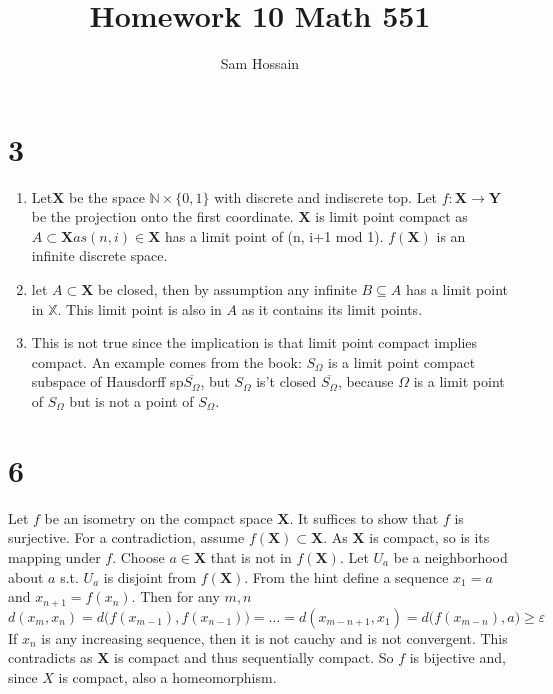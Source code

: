 \documentclass[a4paper, 12pt]{article}
\begin{document}
\title{Homework 10 Math 551}
\author{Sam Hossain}

\maketitle
\section*{3}

\begin{enumerate}[label=(\alph*)]
	\item Let$\mathbf{X}$ be the space $\mathbb{N} \times \{0, 1\}$ with discrete and indiscrete top. Let $f:\mathbf{X} \longrightarrow \mathbf{Y}$ be the projection onto the first coordinate. $\mathbf{X}$ is limit point compact as $A \subset \mathbf{X} as (n, i) \in{\mathbf{X}}$ has a limit point of (n, i+1 mod 1). $f(\mathbf{X})$ is an infinite discrete space.

	\item let $A \subset \mathbf{X}$ be closed, then by assumption any infinite $B \subseteq A$ has a limit point in $\mathbb{X}$. This limit point is also in $A$ as it contains its limit points.
	\item This is not true since the implication is that limit point compact implies compact. An example comes from the book: $S_\Omega$ is a limit point compact subspace of Hausdorff sp$\overline{S_\Omega}$, but $S_\Omega$ is't closed $\overline{S_\Omega}$, because 
$\Omega$ is a limit point of $S_\Omega$ but is not a point of $S_\Omega$.
\end{enumerate}

\section*{6}
	Let $f$ be an isometry on the compact space $\mathbf{X}$. It suffices to show that $f$ is surjective. For a contradiction, assume $f(\mathbf{X}) \subset \mathbf{X}$. As $\mathbf{X}$ is compact, so is its mapping under $f$. Choose $ a \in \mathbf{X}$ that is not in $f(\mathbf{X})$. Let $U_a$ be a neighborhood about $a$ s.t. $U_a$ is disjoint from $f(\mathbf{X})$. From the hint define a sequence $x_1 = a$ and $x_{n+1} = f(x_n)$. Then for any $m,n$\newline $d \left( x_m, x_n \right) = d \big( f\left(x_{m-1}\right), f\left( x_{n-1} \right) \big) 
= \ldots =  d \left( x_{m-n+1}, x_1 \right) = d \big( f\left( x_{m-n} \right), a \big) \geq \varepsilon$ If $x_n$ is any increasing sequence, then it is not cauchy and is not convergent. This contradicts as $\mathbf{X}$ is compact and thus sequentially compact. So $f$ is bijective and, since $X$ is compact, also a homeomorphism.
\end{document}
